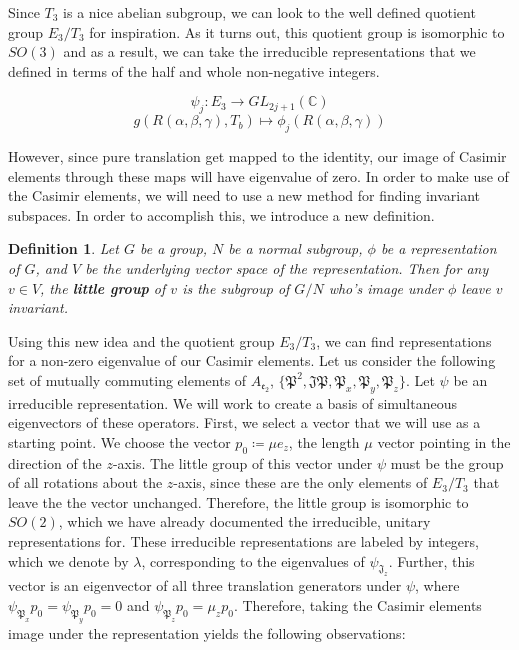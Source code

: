\documentclass[10pt]{ucthesis}
\newcommand{\C}{\mathbb{C}}
\newtheorem{definition}{Definition}[chapter]
\begin{document}
Since $T_3$ is a nice abelian subgroup, we can look to the well defined quotient group $E_3/T_3$ for inspiration. As it turns out, this quotient group is isomorphic to $SO(3)$ and as a result, we can take the irreducible representations that we defined in terms of the half and whole non-negative integers.

$$\psi_j: E_3 \rightarrow GL_{2j+1}(\C)$$
$$g(R(\alpha,\beta,\gamma), T_b) \mapsto \phi_j(R(\alpha,\beta,\gamma))$$

However, since pure translation get mapped to the identity, our image of Casimir elements through these maps will have eigenvalue of zero. In order to make use of the Casimir elements, we will need to use a new method for finding invariant subspaces. In order to accomplish this, we introduce a new definition.

\begin{definition}
	Let $G$ be a group, $N$ be a normal subgroup, $\phi$ be a representation of $G$, and $V$ be the underlying vector space of the representation. Then for any $v\in V$, the \textbf{little group} of $v$ is the subgroup of $G/N$ who's image under $\phi$ leave $v$ invariant.
\end{definition}

Using this new idea and the quotient group $E_3/T_3$, we can find representations for a non-zero eigenvalue of our Casimir elements. Let us consider the following set of mutually commuting elements of $A_\mathfrak{e_2}$, $\{\mathfrak{P^2},\mathfrak{JP},\mathfrak{P}_x,\mathfrak{P}_y,\mathfrak{P}_z\}$. Let $\psi$ be an irreducible representation. We will work to create a basis of simultaneous eigenvectors of these operators. First, we select a vector that we will use as a starting point. We choose the vector $p_0 \coloneq \mu e_z$, the length $\mu$ vector pointing in the direction of the $z$-axis. The little group of this vector under $\psi$ must be the group of all rotations about the $z$-axis, since these are the only elements of $E_3/T_3$ that leave the the vector unchanged. Therefore, the little group is isomorphic to $SO(2)$, which we have already documented the irreducible, unitary representations for. These irreducible representations are labeled by integers, which we denote by $\lambda$, corresponding to the eigenvalues of $\psi_{\mathfrak{J}_z}$. Further, this vector is an eigenvector of all three translation generators under $\psi$, where $\psi_{\mathfrak{P}_x}p_0 = \psi_{\mathfrak{P}_y}p_0 = 0$ and $\psi_{\mathfrak{P}_z}p_0 = \mu_z p_0$. Therefore, taking the Casimir elements image under the representation yields the following observations:
\end{document}
